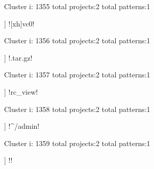 Cluster i: 1355
total projects:2
total patterns:1
\begin{multicols}{1}
\begin{description}[noitemsep,topsep=0pt]
\item [[2] ] \cverb![xh]vc0!
\end{description}
\end{multicols}







Cluster i: 1356
total projects:2
total patterns:1
\begin{multicols}{1}
\begin{description}[noitemsep,topsep=0pt]
\item [[2] ] \cverb!.tar.gz!
\end{description}
\end{multicols}







Cluster i: 1357
total projects:2
total patterns:1
\begin{multicols}{1}
\begin{description}[noitemsep,topsep=0pt]
\item [[2] ] \cverb!rc_view!
\end{description}
\end{multicols}







Cluster i: 1358
total projects:2
total patterns:1
\begin{multicols}{1}
\begin{description}[noitemsep,topsep=0pt]
\item [[2] ] \cverb!^/admin!
\end{description}
\end{multicols}







Cluster i: 1359
total projects:2
total patterns:1
\begin{multicols}{1}
\begin{description}[noitemsep,topsep=0pt]
\item [[2] ] \cverb!!
\end{description}
\end{multicols}







